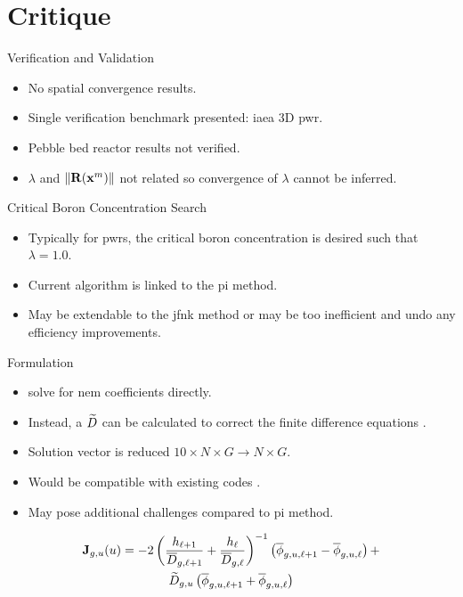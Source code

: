 \section{Critique}
\label{sec:critique}

\begin{frame}{Verification and Validation}
  \begin{itemize}
    \item No spatial convergence results.
    \item Single verification benchmark presented: \gls{iaea} 3D \gls{pwr}.
    \item Pebble bed reactor results not verified.
    \item $\lambda$ and $\| \mathbf{R}(\mathbf{x}^m) \|$ not related so convergence of
      $\lambda$ cannot be inferred.
  \end{itemize}
\end{frame}

\begin{frame}{Critical Boron Concentration Search}
  \begin{itemize}
    \item Typically for \glspl{pwr}, the critical boron concentration is
      desired such that $\lambda = 1.0$.
    \item Current algorithm is linked to the \gls{pi} method.
    \item May be extendable to the \gls{jfnk} method or may be too inefficient
      and undo any efficiency improvements.
  \end{itemize}
\end{frame}

\begin{frame}{ Formulation}
  \begin{itemize}
    \item \citeauthor{qe2paper} solve for \gls{nem} coefficients directly.
    \item Instead, a $\widetilde{D}$ can be calculated to correct the finite
      difference equations \cite{smith_nonlinear,palmtagThesis}.
    \item Solution vector is reduced $10 \times N \times G \rightarrow N \times G$.
    \item Would be compatible with existing codes \cite{casmo4,simulate3,mpact}.
    \item May pose additional challenges compared to \gls{pi} method.
  \end{itemize}
  \begin{multline}
    \label{eq:dtilde}
    \mathbf{J}_{g,u}(u) = 
      -2 \left( \frac{h_{\ell+1}}{\overline{D}_{g,\ell+1}} + 
        \frac{h_{\ell}}{\overline{D}_{g,\ell}} \right)^{-1}
        \left( \overline{\phi}_{g,u,\ell+1} -
        \overline{\phi}_{g,u,\ell} \right) +  \\
      \widetilde{D}_{g,u} \left( \overline{\phi}_{g,u,\ell+1} +
        \overline{\phi}_{g,u,\ell} \right)
  \end{multline}
\end{frame}

